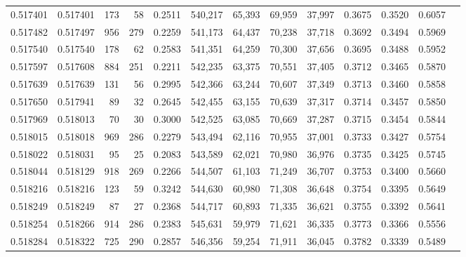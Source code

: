 \begin{tabular}{rrrrrrrrrrrrr}
0.517401 & 0.517401 &   173 &    58 &                                     0.2511 & 540,217 &  65,393 &  69,959 &  37,997 & 0.3675 & 0.3520 & 0.6057 \\
0.517482 & 0.517497 &   956 &   279 &                                     0.2259 & 541,173 &  64,437 &  70,238 &  37,718 & 0.3692 & 0.3494 & 0.5969 \\
0.517540 & 0.517540 &   178 &    62 &                                     0.2583 & 541,351 &  64,259 &  70,300 &  37,656 & 0.3695 & 0.3488 & 0.5952 \\
0.517597 & 0.517608 &   884 &   251 &                                     0.2211 & 542,235 &  63,375 &  70,551 &  37,405 & 0.3712 & 0.3465 & 0.5870 \\
0.517639 & 0.517639 &   131 &    56 &                                     0.2995 & 542,366 &  63,244 &  70,607 &  37,349 & 0.3713 & 0.3460 & 0.5858 \\
0.517650 & 0.517941 &    89 &    32 &                                     0.2645 & 542,455 &  63,155 &  70,639 &  37,317 & 0.3714 & 0.3457 & 0.5850 \\
0.517969 & 0.518013 &    70 &    30 &                                     0.3000 & 542,525 &  63,085 &  70,669 &  37,287 & 0.3715 & 0.3454 & 0.5844 \\
0.518015 & 0.518018 &   969 &   286 &                                     0.2279 & 543,494 &  62,116 &  70,955 &  37,001 & 0.3733 & 0.3427 & 0.5754 \\
0.518022 & 0.518031 &    95 &    25 &                                     0.2083 & 543,589 &  62,021 &  70,980 &  36,976 & 0.3735 & 0.3425 & 0.5745 \\
0.518044 & 0.518129 &   918 &   269 &                                     0.2266 & 544,507 &  61,103 &  71,249 &  36,707 & 0.3753 & 0.3400 & 0.5660 \\
0.518216 & 0.518216 &   123 &    59 &                                     0.3242 & 544,630 &  60,980 &  71,308 &  36,648 & 0.3754 & 0.3395 & 0.5649 \\
0.518249 & 0.518249 &    87 &    27 &                                     0.2368 & 544,717 &  60,893 &  71,335 &  36,621 & 0.3755 & 0.3392 & 0.5641 \\
0.518254 & 0.518266 &   914 &   286 &                                     0.2383 & 545,631 &  59,979 &  71,621 &  36,335 & 0.3773 & 0.3366 & 0.5556 \\
0.518284 & 0.518322 &   725 &   290 &                                     0.2857 & 546,356 &  59,254 &  71,911 &  36,045 & 0.3782 & 0.3339 & 0.5489 \\

\end{tabular}
